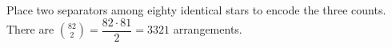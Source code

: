 Place two separators among eighty identical stars to encode the three counts. There are $\binom{82}{2}=\dfrac{82\cdot81}{2}=\boxed{3321}$ arrangements.
